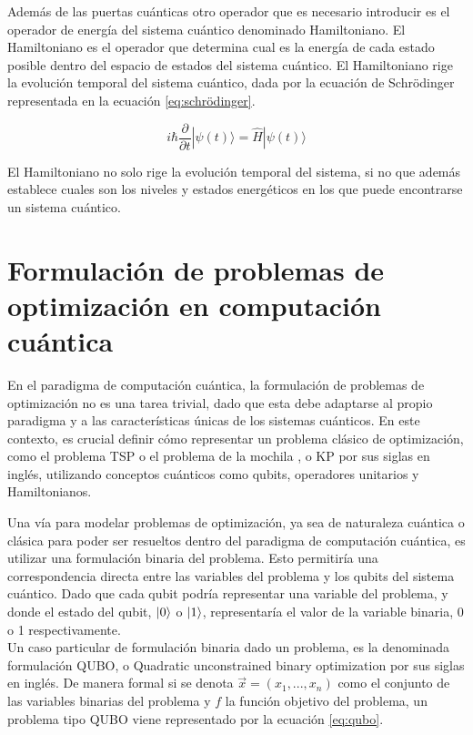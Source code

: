 Además de las puertas cuánticas otro operador que es necesario introducir es el operador de energía del sistema cuántico denominado Hamiltoniano. El Hamiltoniano es el operador que determina cual es la energía de cada estado posible dentro del espacio de estados del sistema cuántico. El Hamiltoniano rige la evolución temporal del sistema cuántico, dada por la ecuación de Schrödinger representada en la ecuación \ref{eq:schrödinger}.

\begin{equation}
    i\hbar \frac{\partial}{\partial t} |\psi(t)\rangle = \hat{H} |\psi(t)\rangle
    \label{eq:schrödinger}
\end{equation}

El Hamiltoniano no solo rige la evolución temporal del sistema, si no que además establece cuales son los niveles y estados energéticos en los que puede encontrarse un sistema cuántico.

\section{Formulación de problemas de optimización en computación cuántica}

En el paradigma de computación cuántica, la formulación de problemas de optimización no es una tarea trivial, dado que esta debe adaptarse al propio paradigma y a las características únicas de los sistemas cuánticos. En este contexto, es crucial definir cómo representar un problema clásico de optimización, como el problema TSP o el problema de la mochila , o KP por sus siglas en inglés, utilizando conceptos cuánticos como qubits, operadores unitarios y Hamiltonianos.

\newpage

Una vía para modelar problemas de optimización, ya sea de naturaleza cuántica o clásica para poder ser resueltos dentro del paradigma de computación cuántica, es utilizar una formulación binaria del problema. Esto permitiría una correspondencia directa entre las variables del problema y los qubits del sistema cuántico. Dado que cada qubit podría representar una variable del problema, y donde el estado del qubit, $\ket{0}$ o $\ket{1}$, representaría el valor de la variable binaria, 0 o 1 respectivamente. \\

Un caso particular de formulación binaria dado un problema, es la denominada formulación QUBO, o Quadratic unconstrained binary optimization por sus siglas en inglés. De manera formal si se denota $\Vec{x} = (x_{1}, ..., x_{n})$ como el conjunto de las variables binarias del problema y $f$ la función objetivo del problema, un problema tipo QUBO viene representado por la ecuación \ref{eq:qubo}.

